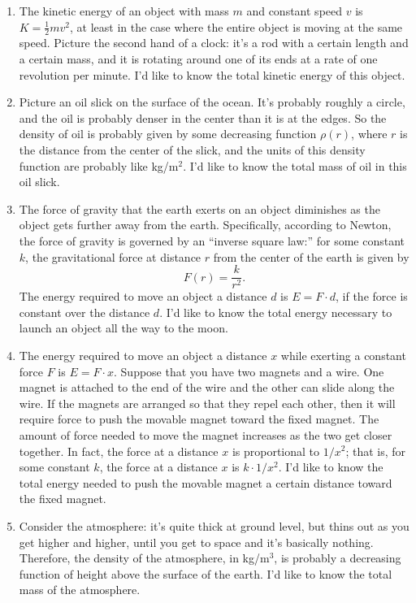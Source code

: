 \documentclass[12pt]{article}
\begin{document}
\begin{enumerate}[leftmargin=0pt]
\item The kinetic energy of an object with mass \(m\) and constant speed \(v\) is \(K = \frac{1}{2} mv^2\), at least in the case where the entire object is moving at the same speed. Picture the second hand of a clock: it's a rod with a certain length and a certain mass, and it is rotating around one of its ends at a rate of one revolution per minute. I'd like to know the total kinetic energy of this object.

\item Picture an oil slick on the surface of the ocean. It's probably roughly a circle, and the oil is probably denser in the center than it is at the edges. So the density of oil is probably given by some decreasing function \(\rho(r)\), where \(r\) is the distance from the center of the slick, and the units of this density function are probably like kg/m\(^2\). I'd like to know the total mass of oil in this oil slick.

\item The force of gravity that the earth exerts on an object diminishes as the object gets further away from the earth. Specifically, according to Newton, the force of gravity is governed by an ``inverse square law:'' for some constant \(k\), the gravitational force at distance \(r\) from the center of the earth is given by 
\[ F(r) = \frac{k}{r^2}.\]
The energy required to move an object a distance \(d\) is \(E = F\cdot d\), if the force is constant over the distance \(d\).  I'd like to know the total energy necessary to launch an object all the way to the moon.

\item The energy required to move an object a distance \(x\) while exerting a constant force \(F\) is \(E = F\cdot x\).  Suppose that you have two magnets and a wire. One magnet is attached to the end of the wire and the other can slide along the wire. If the magnets are arranged so that they repel each other, then it will require force to push the movable magnet toward the fixed magnet. The amount of force needed to move the magnet increases as the two get closer together. In fact, the force at a distance \(x\) is proportional to \(1/x^2\); that is, for some constant $k$, the force at a distance $x$ is $k\cdot 1/x^2$. I'd like to know the total energy needed to push the movable magnet a certain distance toward the fixed magnet.

\item Consider the atmosphere: it's quite thick at ground level, but thins out as you get higher and higher, until you get to space and it's basically nothing. Therefore, the density of the atmosphere, in kg/m\(^3\), is probably a decreasing function of height above the surface of the earth. I'd like to know the total mass of the atmosphere.


\end{enumerate}
\end{document}
